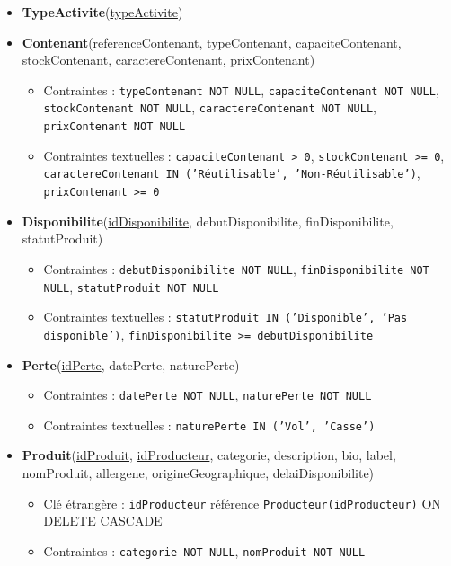 \begin{itemize}
    \item \textbf{TypeActivite}(\underline{typeActivite})
    
    \item \textbf{Contenant}(\underline{referenceContenant}, typeContenant, capaciteContenant, stockContenant, caractereContenant, prixContenant)
    \begin{itemize}
        \item Contraintes : \texttt{typeContenant NOT NULL}, \texttt{capaciteContenant NOT NULL}, \texttt{stockContenant NOT NULL}, \texttt{caractereContenant NOT NULL}, \texttt{prixContenant NOT NULL}
        \item Contraintes textuelles : \texttt{capaciteContenant > 0}, \texttt{stockContenant >= 0}, \texttt{caractereContenant IN ('Réutilisable', 'Non-Réutilisable')}, \texttt{prixContenant >= 0}
    \end{itemize}
    
    \item \textbf{Disponibilite}(\underline{idDisponibilite}, debutDisponibilite, finDisponibilite, statutProduit)
    \begin{itemize}
        \item Contraintes : \texttt{debutDisponibilite NOT NULL}, \texttt{finDisponibilite NOT NULL}, \texttt{statutProduit NOT NULL}
        \item Contraintes textuelles : \texttt{statutProduit IN ('Disponible', 'Pas disponible')}, \texttt{finDisponibilite >= debutDisponibilite}
    \end{itemize}
    
    \item \textbf{Perte}(\underline{idPerte}, datePerte, naturePerte)
    \begin{itemize}
        \item Contraintes : \texttt{datePerte NOT NULL}, \texttt{naturePerte NOT NULL}
        \item Contraintes textuelles : \texttt{naturePerte IN ('Vol', 'Casse')}
    \end{itemize}
    
    \item \textbf{Produit}(\underline{idProduit}, \underline{idProducteur}, categorie, description, bio, label, nomProduit, allergene, origineGeographique, delaiDisponibilite)
    \begin{itemize}
        \item Clé étrangère : \texttt{idProducteur} référence \texttt{Producteur(idProducteur)} ON DELETE CASCADE
        \item Contraintes : \texttt{categorie NOT NULL}, \texttt{nomProduit NOT NULL}
    \end{itemize}
    

\end{itemize}

